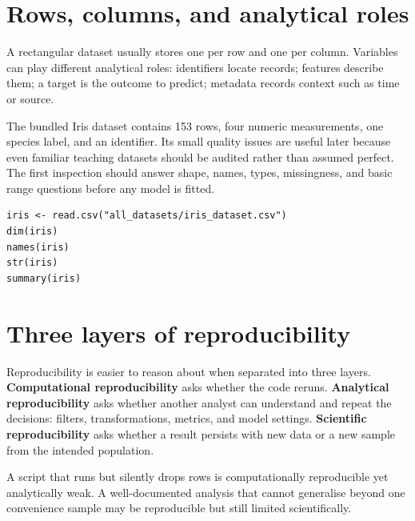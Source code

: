 \section{Rows, columns, and analytical roles}
A rectangular dataset usually stores one  per row and one  per column. Variables can play different analytical roles: identifiers locate records; features describe them; a target is the outcome to predict; metadata records context such as time or source.

The bundled Iris dataset contains 153 rows, four numeric measurements, one species label, and an identifier. Its small quality issues are useful later because even familiar teaching datasets should be audited rather than assumed perfect. The first inspection should answer shape, names, types, missingness, and basic range questions before any model is fitted.

\begin{lstlisting}[style=dsr]
iris <- read.csv("all_datasets/iris_dataset.csv")
dim(iris)
names(iris)
str(iris)
summary(iris)
\end{lstlisting}


\section{Three layers of reproducibility}
Reproducibility is easier to reason about when separated into three layers. \textbf{Computational reproducibility} asks whether the code reruns. \textbf{Analytical reproducibility} asks whether another analyst can understand and repeat the decisions: filters, transformations, metrics, and model settings. \textbf{Scientific reproducibility} asks whether a result persists with new data or a new sample from the intended population.

A script that runs but silently drops rows is computationally reproducible yet analytically weak. A well-documented analysis that cannot generalise beyond one convenience sample may be reproducible but still limited scientifically.

